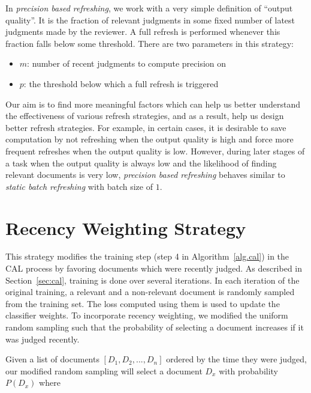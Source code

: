 In \textit{precision based refreshing}, we work with a very simple definition of
``output quality''. It is the fraction of relevant judgments in some fixed
number of latest judgments made by the reviewer. A full refresh is performed
whenever this fraction falls below some threshold. There are two parameters in
this strategy:
\begin{itemize}
    \item $m$: number of recent judgments to compute precision on
    \item $p$: the threshold below which a full refresh is triggered
\end{itemize}

Our aim is to find more meaningful factors which can help us better understand
the effectiveness of various refresh strategies, and as a result, help us design
better refresh strategies. For example, in certain cases, it is desirable to
save computation by not refreshing when the output quality is high and force
more frequent refreshes when the output quality is low. However, during later
stages of a task when the output quality is always low and the likelihood of
finding relevant documents is very low, \textit{precision based refreshing}
behaves similar to \textit{static batch refreshing} with batch size of $1$.


\section{Recency Weighting Strategy}

\label{sec:recency}
This strategy modifies the training step (step 4 in Algorithm~\ref{alg.cal}) in
the CAL process by favoring documents which were recently judged. As described
in Section~\ref{sec:cal}, training is done over several iterations. In each
iteration of the original training, a relevant and a non-relevant document is
randomly sampled from the training set. The loss computed using them is used to
update the classifier weights. To incorporate recency weighting, we modified the
uniform random sampling such that the probability of selecting a document
increases if it was judged recently.

Given a list of documents $[D_1, D_2, ..., D_n]$ ordered by the time
they were judged, our modified random sampling will
select a document $D_x$ with probability $P(D_x)$ where

